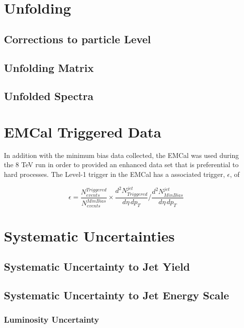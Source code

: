 \section{Unfolding}

\subsection{Corrections to particle Level}

\subsection{Unfolding Matrix}

\subsection{Unfolded Spectra}

\section{EMCal Triggered Data}

In addition with the minimum bias data collected, the EMCal was used during the 8 TeV run in order to provided an enhanced data set that is preferential to hard processes.   The Level-1 trigger\cite{Bourrion:2010js} in the EMCal has a associated trigger, $\epsilon$, of 

\begin{equation}
	\epsilon = \frac{N^{Triggered}_{events}}{N^{MinBias}_{events}} \times \frac{d^{2} N_{Triggered}^{jet}}{d\eta \, dp_{T}} \Bigg/  \frac{d^{2} N_{MinBias}^{jet}}{d\eta \, dp_{T}} 
\label{eq:xsecdef}
\end{equation}

\section{Systematic Uncertainties}

\subsection{Systematic Uncertainty to Jet Yield}

\subsection{Systematic Uncertainty to Jet Energy Scale}

\subsubsection{Luminosity Uncertainty}

